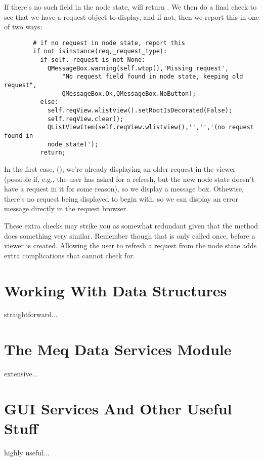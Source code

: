 \documentclass[12pt,twoside]{book}
\begin{document}
  If there's no such field in the node state,  will return
  . We then do a final check to see that we have a request object 
  to display, and if not, then we report this in one of two ways:

\begin{verbatim}  
        # if no request in node state, report this
        if not isinstance(req,_request_type): 
          if self._request is not None:
            QMessageBox.warning(self.wtop(),'Missing request',
                "No request field found in node state, keeping old request",
                QMessageBox.Ok,QMessageBox.NoButton);
          else:
            self.reqView.wlistview().setRootIsDecorated(False);
            self.reqView.clear();
            QListViewItem(self.reqView.wlistview(),'','','(no request found in
            node state)');
          return;
\end{verbatim}  

  In the first case, (), we're already
  displaying an older request in the viewer (possible if, e.g., the user has
  asked for a refresh, but the new node state doesn't have a request in it for
  some reason), so we display a message box. Othewise, there's no request being
  displayed to begin with, so we can display an error message directly in the
  request browser.

  These extra checks may strike you as somewhat redundant given that the
   method does something very similar. Remember though that
   is only called once, before a viewer is created. Allowing
  the user to refresh a request from the node state adds extra complications
  that  cannot check for.
  
\chapter{Working With Data Structures}

  straightforward...

\chapter{The Meq Data Services Module}  

  extensive...

\chapter{GUI Services And Other Useful Stuff}

  highly useful...
\end{document}
